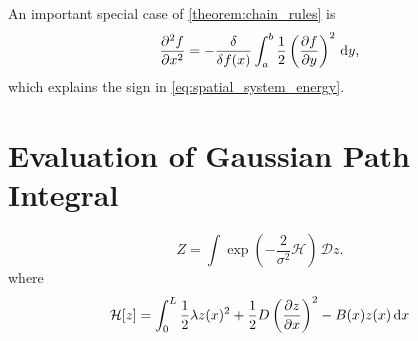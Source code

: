 An important special case of \cref{theorem:chain_rules} is
\begin{equation}
  \label{eq:derivative_of_squared_derivative}
  \pdv[2]{f}{x} = -\fdv{f(x)}\int_a^b \frac{1}{2}\left(\pdv{f}{y}\right)^2\,\mathrm{d}y,
\end{equation}
which explains the sign in \cref{eq:spatial_system_energy}.

\section{Evaluation of Gaussian Path Integral}
\label{sec:evaluation_of_integral}
 \begin{equation}
   \label{eq:path_integral}
   Z = \int \exp\left( -\frac{2}{\sigma^2} \mathcal{H} \right) \, \mathcal{D}z.
 \end{equation}
 where
 \begin{equation}
   \label{eq:hamiltonian}
   \mathcal{H}[z] = \int_0^L \frac{1}{2}\lambda z(x)^2 + \frac{1}{2}D\left(\pdv{z}{x}\right)^2 - B(x)z(x)\dd{x}
 \end{equation}

